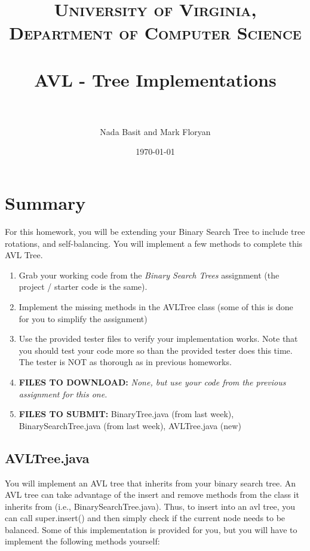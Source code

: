 \documentclass[paper=a4, fontsize=11pt, parskip=full]{scrartcl} %
\title{
\normalfont \normalsize
\textsc{University of Virginia, Department of Computer Science} \\ [25pt] %
\horrule{0.5pt} \\[0.4cm] %
\huge AVL - Tree Implementations \\ %
\horrule{2pt} \\[0.5cm] %
}
\author{Nada Basit and Mark Floryan}
\date{\normalsize\today} %
\numberwithin{equation}{section} %
\numberwithin{figure}{section} %
\numberwithin{table}{section} %
\begin{document}
\maketitle %


\section{Summary}

For this homework, you will be extending your Binary Search Tree to include tree rotations, and self-balancing. You will implement a few methods to complete this AVL Tree.

\begin{enumerate}
	\item Grab your working code from the \emph{Binary Search Trees} assignment (the project / starter code is the same).
	\item Implement the missing methods in the AVLTree class (some of this is done for you to simplify the assignment)
	\item Use the provided tester files to verify your implementation works. Note that you should test your code more so than the provided tester does this time. The tester is NOT as thorough as in previous homeworks.
	\item \textbf{FILES TO DOWNLOAD:} \emph{None, but use your code from the previous assignment for this one.}
	\item \textbf{FILES TO SUBMIT:} BinaryTree.java (from last week), BinarySearchTree.java (from last week), AVLTree.java (new)
\end{enumerate}


\subsection{AVLTree.java}

You will implement an AVL tree that inherits from your binary search tree. An AVL tree can take advantage of the insert and remove methods from the class it inherits from (i.e., BinarySearchTree.java). Thus, to insert into an avl tree, you can call super.insert() and then simply check if the current node needs to be balanced. Some of this implementation is provided for you, but you will have to implement the following methods yourself:
\end{document}
